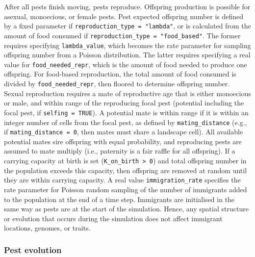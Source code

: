 \documentclass[10pt,letterpaper]{article}
\begin{document}
After all pests finish moving, pests reproduce.
Offspring production is possible for asexual, monoecious, or female pests.
Pest expected offspring number is defined by a fixed parameter if \texttt{reproduction\_type\ =\ "lambda"}, or is calculated from the amount of food consumed if \texttt{reproduction\_type\ =\ "food\_based"}.
The former requires specifying \texttt{lambda\_value}, which becomes the rate parameter for sampling offspring number from a Poisson distribution.
The latter requires specifying a real value for \texttt{food\_needed\_repr}, which is the amount of food needed to produce one offspring.
For food-based reproduction, the total amount of food consumed is divided by \texttt{food\_needed\_repr}, then floored to determine offspring number.
Sexual reproduction requires a mate of reproductive age that is either monoecious or male, and within range of the reproducing focal pest (potential including the focal pest, if \texttt{selfing\ =\ TRUE}).
A potential mate is within range if it is within an integer number of cells from the focal pest, as defined by \texttt{mating\_distance} (e.g., if \texttt{mating\_distance\ =\ 0}, then mates must share a landscape cell).
All available potential mates sire offspring with equal probability, and reproducing pests are assumed to mate multiply (i.e., paternity is a fair raffle for all offspring).
If a carrying capacity at birth is set (\texttt{K\_on\_birth\ \textgreater{}\ 0}) and total offspring number in the population exceeds this capacity, then offspring are removed at random until they are within carrying capacity.
A real value \texttt{immigration\_rate} specifies the rate parameter for Poisson random sampling of the number of immigrants added to the population at the end of a time step.
Immigrants are initialised in the same way as pests are at the start of the simulation.
Hence, any spatial structure or evolution that occurs during the simulation does not affect immigrant locations, genomes, or traits.


\hypertarget{evolution}{%
\subsubsection{Pest evolution}\label{evolution}}
\end{document}

